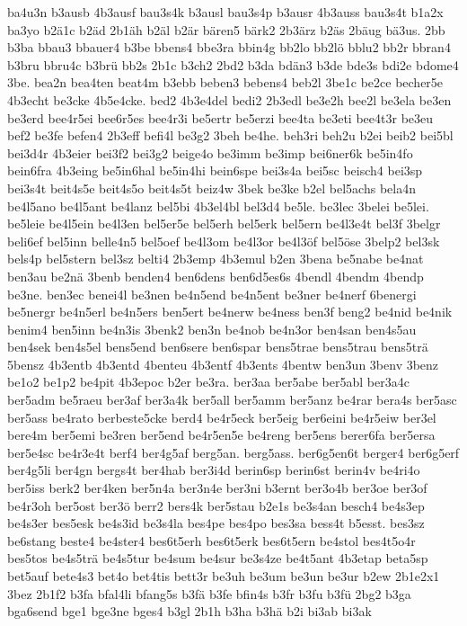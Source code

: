 {ba4u3n
b3ausb
4b3ausf
bau3s4k
b3ausl
bau3s4p
b3ausr
4b3auss
bau3s4t
b1a2x
ba3yo
b2ä1c
b2äd
2b1äh
b2äl
b2är
bären5
bärk2
2b3ärz
b2äs
2bäug
bä3us.
2bb
b3ba
bbau3
bbauer4
b3be
bbens4
bbe3ra
bbin4g
bb2lo
bb2lö
bblu2
bb2r
bbran4
b3bru
bbru4c
b3brü
bb2s
2b1c
b3ch2
2bd2
b3da
bdän3
b3de
bde3s
bdi2e
bdome4
3be.
bea2n
bea4ten
beat4m
b3ebb
beben3
bebens4
beb2l
3be1c
be2ce
becher5e
4b3echt
be3cke
4b5e4cke.
bed2
4b3e4del
bedi2
2b3edl
be3e2h
bee2l
be3ela
be3en
be3erd
bee4r5ei
bee6r5es
bee4r3i
be5ertr
be5erzi
bee4ta
be3eti
bee4t3r
be3eu
bef2
be3fe
befen4
2b3eff
befi4l
be3g2
3beh
be4he.
beh3ri
beh2u
b2ei
beib2
bei5bl
bei3d4r
4b3eier
bei3f2
bei3g2
beige4o
be3imm
be3imp
bei6ner6k
be5in4fo
bein6fra
4b3eing
be5in6hal
be5in4hi
bein6spe
bei3s4a
bei5sc
beisch4
bei3sp
bei3s4t
beit4s5e
beit4s5o
beit4s5t
beiz4w
3bek
be3ke
b2el
bel5achs
bela4n
be4l5ano
be4l5ant
be4lanz
bel5bi
4b3el4bl
bel3d4
be5le.
be3lec
3belei
be5lei.
be5leie
be4l5ein
be4l3en
bel5er5e
bel5erh
bel5erk
bel5ern
be4l3e4t
bel3f
3belgr
beli6ef
bel5inn
belle4n5
bel5oef
be4l3om
be4l3or
be4l3öf
bel5öse
3belp2
bel3sk
bels4p
bel5stern
bel3sz
belti4
2b3emp
4b3emul
b2en
3bena
be5nabe
be4nat
ben3au
be2nä
3benb
benden4
ben6dens
ben6d5es6s
4bendl
4bendm
4bendp
be3ne.
ben3ec
benei4l
be3nen
be4n5end
be4n5ent
be3ner
be4nerf
6benergi
be5nergr
be4n5erl
be4n5ers
ben5ert
be4nerw
be4ness
ben3f
beng2
be4nid
be4nik
benim4
ben5inn
be4n3is
3benk2
ben3n
be4nob
be4n3or
ben4san
ben4s5au
ben4sek
ben4s5el
bens5end
ben6sere
ben6spar
bens5trae
bens5trau
bens5trä
5bensz
4b3entb
4b3entd
4benteu
4b3entf
4b3ents
4bentw
ben3un
3benv
3benz
be1o2
be1p2
be4pit
4b3epoc
b2er
be3ra.
ber3aa
ber5abe
ber5abl
ber3a4c
ber5adm
be5raeu
ber3af
ber3a4k
ber5all
ber5amm
ber5anz
be4rar
bera4s
ber5asc
ber5ass
be4rato
berbeste5cke
berd4
be4r5eck
ber5eig
ber6eini
be4r5eiw
ber3el
bere4m
ber5emi
be3ren
ber5end
be4r5en5e
be4reng
ber5ens
berer6fa
ber5ersa
ber5e4sc
be4r3e4t
berf4
ber4g5af
berg5an.
berg5ass.
ber6g5en6t
berger4
ber6g5erf
ber4g5li
ber4gn
bergs4t
ber4hab
ber3i4d
berin6sp
berin6st
berin4v
be4ri4o
ber5iss
berk2
ber4ken
ber5n4a
ber3n4e
ber3ni
b3ernt
ber3o4b
ber3oe
ber3of
be4r3oh
ber5ost
ber3ö
berr2
bers4k
ber5stau
b2e1s
be3s4an
besch4
be4s3ep
be4s3er
bes5esk
be4s3id
be3s4la
bes4pe
bes4po
bes3sa
bess4t
b5esst.
bes3sz
be6stang
beste4
be4ster4
bes6t5erh
bes6t5erk
bes6t5ern
be4stol
bes4t5o4r
bes5tos
be4s5trä
be4s5tur
be4sum
be4sur
be3s4ze
be4t5ant
4b3etap
beta5sp
bet5auf
bete4s3
bet4o
bet4tis
bett3r
be3uh
be3um
be3un
be3ur
b2ew
2b1e2x1
3bez
2b1f2
b3fa
bfal4li
bfang5s
b3fä
b3fe
bfin4s
b3fr
b3fu
b3fü
2bg2
b3ga
bga6send
bge1
bge3ne
bges4
b3gl
2b1h
b3ha
b3hä
b2i
bi3ab
bi3ak
}
